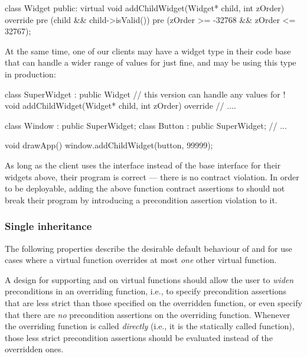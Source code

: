 \begin{codeblock}
class Widget {
public:
  virtual void addChildWidget(Widget* child, int zOrder) override
    pre (child && child->isValid())
    pre (zOrder >= -32768 && zOrder <= 32767);
}
\end{codeblock}

At the same time, one of our clients may have a widget type in their code base that can handle a wider range of values for  just fine, and may be using this type in production:

\begin{codeblock}
class SuperWidget : public Widget {
  // this version can handle any values for !
  void addChildWidget(Widget* child, int zOrder) override {
    // ....
  } 
}

class Window : public SuperWidget;
class Button : public SuperWidget;
// ...

void drawApp() {
  window.addChildWidget(button, 99999);
}
\end{codeblock}
As long as the client uses the  interface instead of the base  interface for their widgets above, their program is correct --- there is no contract violation. In order to be deployable, adding the above function contract assertions to \allowbreak{} should not break their program by introducing a precondition assertion violation to it.

\subsubsection{Single inheritance}

The following properties describe the desirable default behaviour of  and  for use cases where a virtual function overrides at most \emph{one} other virtual function.


A design for supporting  and  on virtual functions should allow the user to \emph{widen} preconditions in an overriding function, i.e., to specify precondition assertions that are less strict than those specified on the overridden function, or even specify that there are \emph{no} precondition assertions on the overriding function. Whenever the overriding function is called \emph{directly} (i.e., it is the statically called function), those less strict precondition assertions should be evaluated instead of the overridden ones.

